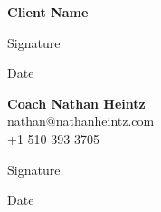 \documentclass[11pt,letterpaper]{article}
\begin{document}
\vspace{2em}

\noindent \textbf{Client Name} \underline{\hspace{3in}}

\vspace{1em}

\noindent Signature \hspace{0.5em} \underline{\hspace{3in}}

\vspace{1em}

\noindent Date \hspace{2em} \underline{\hspace{3in}}

\vspace{3em}

{\noindent \textbf{Coach Nathan Heintz} \\
nathan@nathanheintz.com \\
+1 510 393 3705}

\vspace{1em}

\noindent Signature \hspace{0.5em} \underline{\hspace{3in}}

\vspace{1em}

\noindent Date \hspace{2em} \underline{\hspace{3in}}
\end{document}
